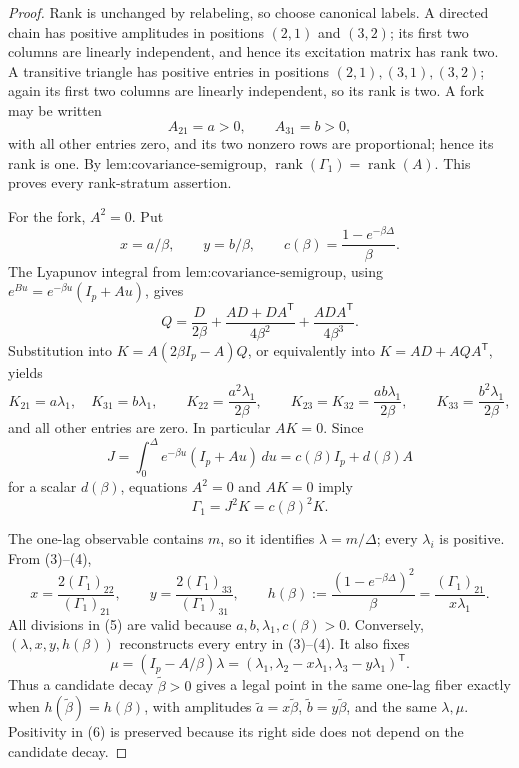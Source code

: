 \documentclass{article}
\begin{document}
\begin{proof}
Rank is unchanged by relabeling, so choose canonical labels.  A directed chain has positive amplitudes in positions \((2,1)\) and \((3,2)\); its first two columns are linearly independent, and hence its excitation matrix has rank two.  A transitive triangle has positive entries in positions \((2,1),(3,1),(3,2)\); again its first two columns are linearly independent, so its rank is two.  A fork may be written
\[
 A_{21}=a>0,\qquad A_{31}=b>0,
\]
with all other entries zero, and its two nonzero rows are proportional; hence its rank is one.  By \(\text{lem:covariance-semigroup}\), \(\operatorname{rank}(\Gamma_1)=\operatorname{rank}(A)\).  This proves every rank-stratum assertion.

For the fork, \(A^2=0\).  Put
\[
 x=a/\beta,\qquad y=b/\beta,\qquad
 c(\beta)=\frac{1-e^{-\beta\Delta}}{\beta}.
\tag{1}
\]
The Lyapunov integral from \(\text{lem:covariance-semigroup}\), using \(e^{Bu}=e^{-\beta u}(I_p+Au)\), gives
\[
 Q=\frac{D}{2\beta}+\frac{AD+DA^{\mathsf T}}{4\beta^2}
   +\frac{ADA^{\mathsf T}}{4\beta^3}.
\tag{2}
\]
Substitution into \(K=A(2\beta I_p-A)Q\), or equivalently into \(K=AD+AQA^{\mathsf T}\), yields
\[
 K_{21}=a\lambda_1,\quad K_{31}=b\lambda_1,\qquad
 K_{22}=\frac{a^2\lambda_1}{2\beta},\qquad
 K_{23}=K_{32}=\frac{ab\lambda_1}{2\beta},\qquad
 K_{33}=\frac{b^2\lambda_1}{2\beta},
\tag{3}
\]
and all other entries are zero.  In particular \(AK=0\).  Since
\[
 J=\int_0^\Delta e^{-\beta u}(I_p+Au)\,du=c(\beta)I_p+d(\beta)A
\]
for a scalar \(d(\beta)\), equations \(A^2=0\) and \(AK=0\) imply
\[
 \Gamma_1=J^2K=c(\beta)^2K.
\tag{4}
\]

The one-lag observable contains \(m\), so it identifies \(\lambda=m/\Delta\); every \(\lambda_i\) is positive.  From (3)--(4),
\[
 x=\frac{2(\Gamma_1)_{22}}{(\Gamma_1)_{21}},\qquad
 y=\frac{2(\Gamma_1)_{33}}{(\Gamma_1)_{31}},\qquad
 h(\beta):=\frac{(1-e^{-\beta\Delta})^2}{\beta}
 =\frac{(\Gamma_1)_{21}}{x\lambda_1}.
\tag{5}
\]
All divisions in (5) are valid because \(a,b,\lambda_1,c(\beta)>0\).  Conversely, \((\lambda,x,y,h(\beta))\) reconstructs every entry in (3)--(4).  It also fixes
\[
 \mu=(I_p-A/\beta)\lambda
 =(\lambda_1,\lambda_2-x\lambda_1,\lambda_3-y\lambda_1)^{\mathsf T}.
\tag{6}
\]
Thus a candidate decay \(\widetilde\beta>0\) gives a legal point in the same one-lag fiber exactly when \(h(\widetilde\beta)=h(\beta)\), with amplitudes \(\widetilde a=x\widetilde\beta\), \(\widetilde b=y\widetilde\beta\), and the same \(\lambda,\mu\).  Positivity in (6) is preserved because its right side does not depend on the candidate decay.


\end{proof}
\end{document}
